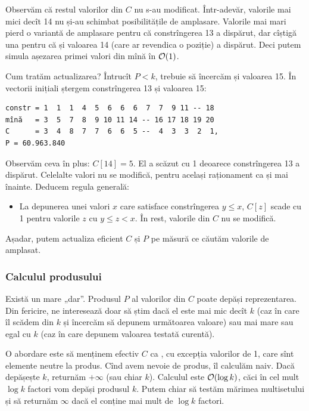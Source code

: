 \documentclass[../main.tex]{subfiles}
\begin{document}
Observăm că restul valorilor din $C$ nu s-au modificat. Într-adevăr, valorile mai mici decît 14 nu și-au schimbat posibilitățile de amplasare. Valorile mai mari pierd o variantă de amplasare pentru că constrîngerea 13 a dispărut, dar cîștigă una pentru că și valoarea 14 (care ar revendica o poziție) a dispărut. Deci putem simula așezarea primei valori din mînă în $\mathcal{O}(1)$.

Cum tratăm actualizarea? Întrucît $P < k$, trebuie să încercăm și valoarea 15. În vectorii inițiali ștergem constrîngerea 13 și valoarea 15:

\begin{verbatim}
constr = 1  1  1  4  5  6  6  6  7  7  9 11 -- 18
mînă   = 3  5  7  8  9 10 11 14 -- 16 17 18 19 20
C      = 3  4  8  7  7  6  6  5 --  4  3  3  2  1,
P = 60.963.840
\end{verbatim}

Observăm ceva în plus: $C[14] = 5$. El a scăzut cu 1 deoarece constrîngerea 13 a dispărut. Celelalte valori nu se modifică, pentru același raționament ca și mai înainte. Deducem regula generală:

\begin{itemize}
  \item La depunerea unei valori $x$ care  satisface constrîngerea $y \leq x$, $C[z]$ scade cu 1 pentru valorile $z$ cu $y \leq z < x$. În rest, valorile din $C$ nu se modifică.
\end{itemize}

Așadar, putem actualiza eficient $C$ și $P$ pe măsură ce căutăm valorile de amplasat.

\subsubsection*{Calculul produsului}

Există un mare „dar”. Produsul $P$ al valorilor din $C$ poate depăși reprezentarea. Din fericire, ne interesează doar să știm dacă el este mai mic decît $k$ (caz în care îl scădem din $k$ și încercăm să depunem următoarea valoare) sau mai mare sau egal cu $k$ (caz în care depunem valoarea testată curentă).

O abordare este să menținem efectiv $C$ ca , cu excepția valorilor de 1, care sînt elemente neutre la produs. Cînd avem nevoie de produs, îl calculăm naiv. Dacă depășește $k$, returnăm $+\infty$ (sau chiar $k$). Calculul este $\mathcal{O}(\log k)$, căci în cel mult $\log k$ factori vom depăși produsul $k$. Putem chiar să testăm mărimea multisetului și să returnăm $\infty$ dacă el conține mai mult de $\log k$ factori.
\end{document}
